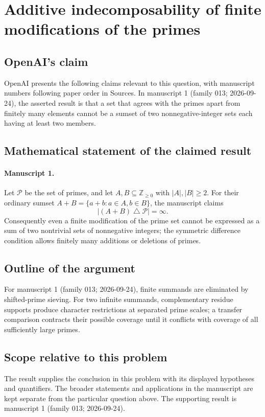 \documentclass[11pt]{article}
\begin{document}
\section*{Additive indecomposability of finite modifications of the primes}

\subsection{OpenAI's claim}
OpenAI presents the following claims relevant to this question, with manuscript numbers following paper order in Sources. In manuscript 1 (family 013; 2026-09-24), the asserted result is that a set that agrees with the primes apart from finitely many elements cannot be a sumset of two nonnegative-integer sets each having at least two members.

\subsection{Mathematical statement of the claimed result}
\paragraph{Manuscript 1.}
Let $\mathcal P$ be the set of primes, and let $A,B\subseteq\mathbb Z_{\ge0}$ with $|A|,|B|\ge2$. For their ordinary sumset $A+B=\{a+b:a\in A,b\in B\}$, the manuscript claims
\[
 |(A+B)\mathbin{\triangle}\mathcal P|=\infty.
\]
Consequently even a finite modification of the prime set cannot be expressed as a sum of two nontrivial sets of nonnegative integers; the symmetric difference condition allows finitely many additions or deletions of primes.

\subsection{Outline of the argument}
For manuscript 1 (family 013; 2026-09-24), finite summands are eliminated by shifted-prime sieving. For two infinite summands, complementary residue supports produce character restrictions at separated prime scales; a transfer comparison contracts their possible coverage until it conflicts with coverage of all sufficiently large primes.

\subsection{Scope relative to this problem}
The result supplies the conclusion in this problem with its displayed hypotheses and quantifiers. The broader statements and applications in the manuscript are kept separate from the particular question above. The supporting result is manuscript 1 (family 013; 2026-09-24).
\end{document}

